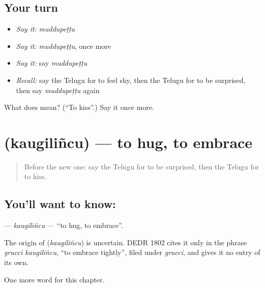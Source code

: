 \subsection*{Your turn}
\begin{itemize}
\raggedright
  \item \emph{Say it:} \emph{muddupeṭṭu}
  \item \emph{Say it:} \emph{muddupeṭṭu}, once more
  \item \emph{Say it:} say \emph{muddupeṭṭu}
  \item \emph{Recall:} say the Telugu for to feel shy, then the Telugu for to be surprised, then say \emph{muddupeṭṭu} again
\end{itemize}

\begin{tcolorbox}[breakable,colback=teal!4,colframe=teal!35!black,title={Before you move on}]
What does  mean? (\textquotedblleft{}To kiss\textquotedblright{}.) Say it once more.
\end{tcolorbox}
\section[\texorpdfstring{\te{కౌగిలించు} (kaugiliñcu)}{కౌగిలించు (kaugiliñcu)}]{ (kaugiliñcu) — to hug, to embrace}

\label{lesson:TE-C162-kaugilincu}



\begin{quote}
Before the new one: say the Telugu for to be surprised, then the Telugu for to kiss.
\end{quote}

\subsection*{You'll want to know: }
\textbf{} — \emph{kaugiliñcu} — \textquotedblleft{}to hug, to embrace\textquotedblright{}.

\begin{cousinweb}
The origin of \textbf{} (\emph{kaugiliñcu}) is uncertain. DEDR 1802 cites it only in the phrase \emph{grucci kaugiliñcu}, \textquotedblleft{}to embrace tightly\textquotedblright{}, filed under \emph{grucci}, and gives it no entry of its own.
\end{cousinweb}

\begin{grammarlens}[title={What you've built}]
One more word for this chapter.
\end{grammarlens}

